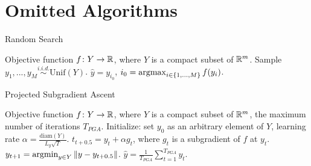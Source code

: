 \section{Omitted Algorithms}\label{Appendix_Algorithm}

\begin{algorithm}[htb!]
   \caption{Random Search}
   \label{Algorithm_random_search}
\begin{algorithmic}
    Objective function $f\colon Y\to{\mathbb R}$, where $Y$ is a compact subset of ${\mathbb R}^m$.
   \STATE Sample $y_1,...,y_M\stackrel{i.i.d.}{\sim}\mathrm{Unif}(Y)$.
    $\hat y=y_{i_0}$, $i_0=\operatorname*{argmax}_{i\in\{1,...,M\}}f(y_i)$.
\end{algorithmic}
\end{algorithm}

\begin{algorithm}[htb!]
   \caption{Projected Subgradient Ascent}
   \label{Algorithm_projected_GD}
\begin{algorithmic}
    Objective function $f\colon Y\to{\mathbb R}$, where $Y$ is a compact subset of ${\mathbb R}^m$, the maximum number of iterations $T_{PGA}$.
   \STATE Initialize: set $y_0$ as an arbitrary element of $Y$, learning rate $\alpha=\frac{\mathrm{diam}(Y)}{L_y\sqrt{T}}$.
   \STATE $t_{t+0.5}=y_t+\alpha g_t$, where $g_t$ is a subgradient of $f$ at $y_t$.
   \STATE $y_{t+1}=\operatorname*{argmin}_{y\in Y} \|y-y_{t+0.5}\|$.
   \ENDFOR
    $\hat y=\frac{1}{T_{PGA}}\sum_{t=1}^{T_{PGA}} y_t$.
\end{algorithmic}
\end{algorithm}

